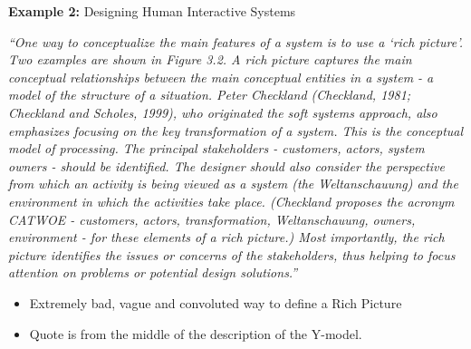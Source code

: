 \begin{frame}
  \textbf{Example 2:} Designing Human Interactive Systems
  
  \medskip
  
  {\tiny \it ``One way to conceptualize the main features of a system is to use
a ‘rich picture’. Two examples are shown in Figure 3.2. A rich picture captures
the main conceptual relationships between the main conceptual entities in a
system - a model of the structure of a situation. Peter Checkland (Checkland,
1981; Checkland and Scholes, 1999), who originated the soft systems approach,
also emphasizes focusing on the key transformation of a system. This is the
conceptual model of processing. The principal stakeholders - customers, actors,
system owners - should be identified. The designer should also consider the
perspective from which an activity is being viewed as a system (the
Weltanschauung) and the environment in which the activities take place.
(Checkland proposes the acronym CATWOE - customers, actors, transformation,
Weltanschauung, owners, environment - for these elements of a rich picture.)
Most importantly, the rich picture identifies the issues or concerns of the
stakeholders, thus helping to focus attention on problems or potential design
solutions.''}

  \medskip

  \begin{itemize}
  \item Extremely bad, vague and convoluted way to define a Rich Picture
  \item Quote is from the middle of the description of the Y-model.
  \end{itemize}
\end{frame}


